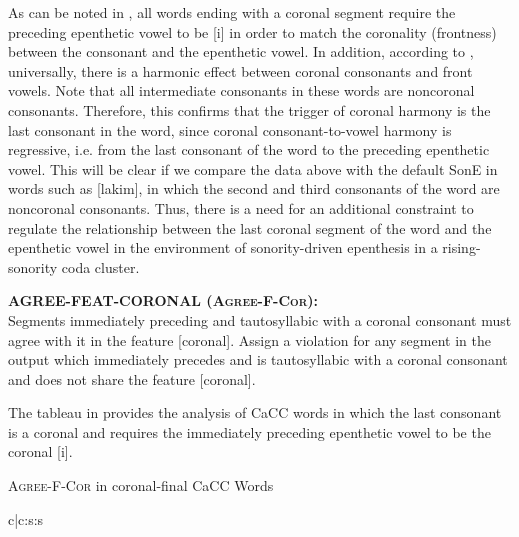 \documentclass[output=paper,colorlinks,citecolor=brown]{langscibook}
\begin{document}
As can be noted in , all words ending with a coronal segment require the preceding epenthetic vowel to be [i] in order to match the coronality (frontness) between the consonant and the epenthetic vowel. In addition, according to \citet{Padgett2011}, universally, there is a harmonic effect between coronal consonants and front vowels. Note that all intermediate consonants in these words are noncoronal consonants. Therefore, this confirms that the trigger of coronal harmony is the last consonant in the word, since coronal consonant-to-vowel harmony is regressive, i.e. from the last consonant of the word to the preceding epenthetic vowel. This will be clear if we compare the data above with the default SonE in words such as [lakim], in which the second and third consonants of the word are noncoronal consonants. Thus, there is a need for an additional constraint to regulate the relationship between the last coronal segment of the word and the epenthetic vowel in the environment of sonority-driven epenthesis in a rising-sonority coda cluster. 

\begin{exe} 
		\ex \label{agree}
				 \textbf{AGREE-FEAT-CORONAL (\textsc{Agree-F-Cor}):} \\
                    Segments immediately preceding and tautosyllabic with a coronal consonant must agree  with it in the feature [coronal]. Assign a violation for any segment in the output which immediately precedes and is tautosyllabic with a coronal consonant and does not share the feature [coronal].
	\end{exe}



The tableau in  provides the analysis of CaCC words in which the last consonant is a coronal and requires the immediately preceding epenthetic vowel to be the coronal [i].


\begin{table}
\caption{\textsc{Agree-F-Cor} in coronal-final CaCC Words}
\label{tab:agree}
\ShadingOn
\begin{tableau}{c|c:s:s} 
      \const*{*O2L1]σ}    
\cand{[ʃakl]}              \vio{*!}  \vio{}  \vio{}    \vio{}   
\cand [\Optimal]{[ʃa.kil]} \vio{}   \vio{}   \vio{*}   \vio{*}  
\cand{[ʃa.kul]}             \vio{}    \vio{*!} \vio{*}  \vio{*}  
\cand{[ʃa.kal]}             \vio{}    \vio{*!} \vio{*}  \vio{*}  

\end{tableau}
\end{table}
\end{document}
